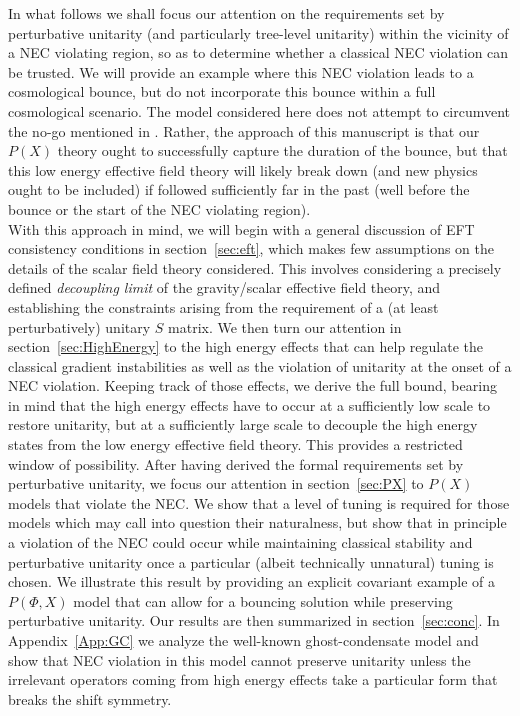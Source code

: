 \documentclass[12pt]{article}
\begin{document}
In what follows we shall focus our attention on the requirements set by perturbative unitarity (and particularly tree-level unitarity) within the vicinity of a NEC violating region, so as to determine whether a classical NEC violation can be trusted. We will provide an example where this NEC violation leads to a cosmological bounce, but do not incorporate this bounce within a full cosmological scenario. The model considered here does not attempt to circumvent the no-go mentioned in \cite{Rubakov:2013kaa, Libanov:2016kfc, Kobayashi:2016xpl,Akama:2017jsa}. Rather, the approach of this manuscript is that our $P(X)$ theory ought to successfully capture the duration of the bounce, but that this low energy effective field theory will likely break down (and new physics ought to be included) if followed sufficiently far in the past (well before the bounce or the start of the NEC violating region). \\

With this approach in mind, we will begin with a general discussion of EFT consistency conditions in section~\ref{sec:eft}, which makes few assumptions on the details of the scalar field theory considered. This involves considering a precisely defined {\it decoupling limit} of the gravity/scalar effective field theory, and establishing the constraints arising from the requirement of a (at least perturbatively) unitary $S$ matrix. We then turn our attention in section~\ref{sec:HighEnergy} to the high energy effects that can help regulate the classical gradient instabilities as well as the violation of unitarity at the onset of a NEC violation. Keeping track of those effects, we derive the full bound, bearing in mind that the high energy effects have to occur at a sufficiently low scale to restore unitarity, but at a sufficiently large scale to decouple the high energy states from the low energy effective field theory. This provides a restricted window of possibility.  After having derived the formal requirements set by perturbative unitarity, we focus our attention in section~\ref{sec:PX} to $P(X)$ models that violate the NEC. We show that a level of tuning is required for those models which may call into question their naturalness, but show that in principle a violation of the NEC could occur while maintaining classical stability and perturbative unitarity once a particular (albeit technically unnatural) tuning is chosen. We illustrate this result by providing an explicit covariant example of a $P(\Phi,X)$ model that can allow for a bouncing solution while preserving perturbative unitarity.  Our results are then summarized in section~\ref{sec:conc}. In Appendix~\ref{App:GC} we analyze the well-known ghost-condensate model and show that NEC violation in this model cannot preserve unitarity unless the irrelevant operators coming from high energy effects take a particular form that breaks the shift symmetry.
\end{document}
